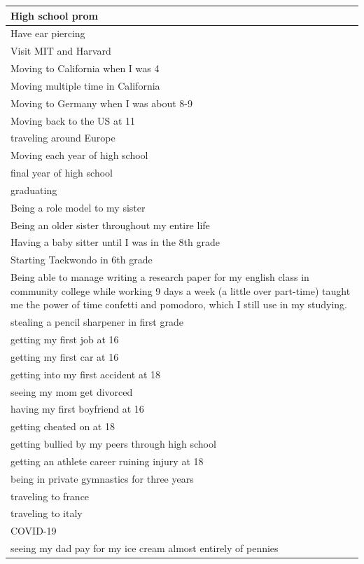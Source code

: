 \documentclass[
  .7em,
  letterpaper,
  DIV=11,
  numbers=noendperiod]{scrartcl}
\begin{document}
\begin{table}
\begin{tabular}{l}
\hline
High school prom\\
\hline
Have ear piercing\\
\hline
Visit MIT and Harvard\\
\hline
Moving to California when I was 4\\
\hline
Moving multiple time in California\\
\hline
Moving to Germany when I was about 8-9\\
\hline
Moving back to the US at 11\\
\hline
traveling around Europe\\
\hline
Moving each year of high school\\
\hline
final year of high school\\
\hline
graduating\\
\hline
Being a role model to my sister\\
\hline
Being an older sister throughout my entire life\\
\hline
Having a baby sitter until I was in the 8th grade\\
\hline
Starting Taekwondo in 6th grade\\
\hline
Being able to manage writing a research paper for my english class in community college while working 9 days a week (a little over part-time) taught me the power of time confetti and pomodoro, which I still use in my studying.\\
\hline
stealing a pencil sharpener in first grade\\
\hline
getting my first job at 16\\
\hline
getting my first car at 16\\
\hline
getting into my first accident at 18\\
\hline
seeing my mom get divorced\\
\hline
having my first boyfriend at 16\\
\hline
getting cheated on at 18\\
\hline
getting bullied by my peers through high school\\
\hline
getting an athlete career ruining injury at 18\\
\hline
being in private gymnastics for three years\\
\hline
traveling to france\\
\hline
traveling to italy\\
\hline
COVID-19\\
\hline
seeing my dad pay for my ice cream almost entirely of pennies\\

\end{tabular}
\end{table}
\end{document}
